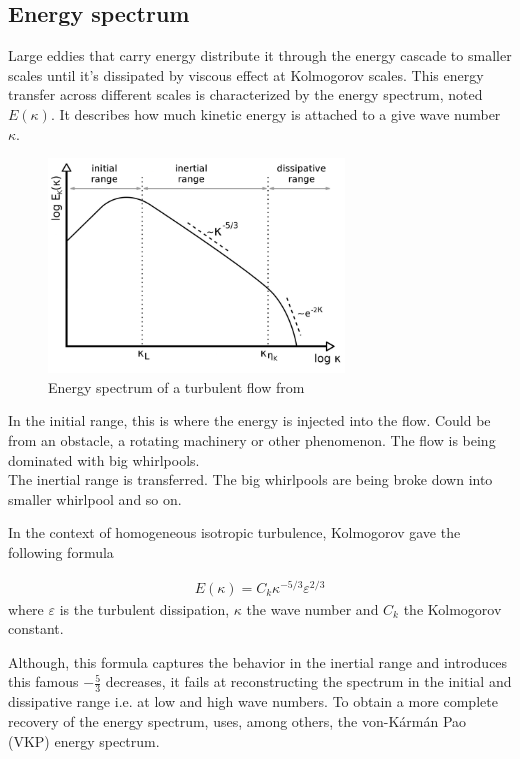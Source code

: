 \documentclass[a4paper,12pt]{article}
\theoremstyle{definition}
\begin{document}
\subsection{Energy spectrum}
Large eddies that carry energy distribute it through the energy cascade to smaller scales until it's dissipated by viscous effect at Kolmogorov scales. 
This energy transfer across different scales is characterized by the energy spectrum, noted $E(\kappa)$. It describes how much kinetic energy is attached to a give wave number $\kappa$. 
\begin{figure}[H]
    \centering
    \includegraphics[width=0.7\textwidth]{illustrations/energy-spectrum-example.png}
    \caption{Energy spectrum of a turbulent flow from \cite{phdthesisRies}}
\end{figure}

In the initial range, this is where the energy is injected into the flow. Could be from an obstacle, a rotating machinery or other phenomenon. The flow is being dominated with big whirlpools. \\
The inertial range is transferred. The big whirlpools are being broke down into smaller whirlpool and so on.  

\bigskip

In the context of homogeneous isotropic turbulence, Kolmogorov gave the following formula  

\begin{align}
    E(\kappa) = C_k \kappa^{-5/3}\varepsilon^{2/3}
\end{align}
where $\varepsilon$ is the turbulent dissipation, $\kappa$ the wave number and $C_k$ the Kolmogorov constant.

Although, this formula captures the behavior in the inertial range and introduces this famous $-\frac{5}{3}$ decreases, it fails at reconstructing the spectrum in the initial and dissipative range i.e. at low and high wave numbers. To obtain a more complete recovery of the energy spectrum, \cite{Janin2021} uses, among others, the von-Kármán Pao (VKP) energy spectrum.
\bigskip
\end{document}

